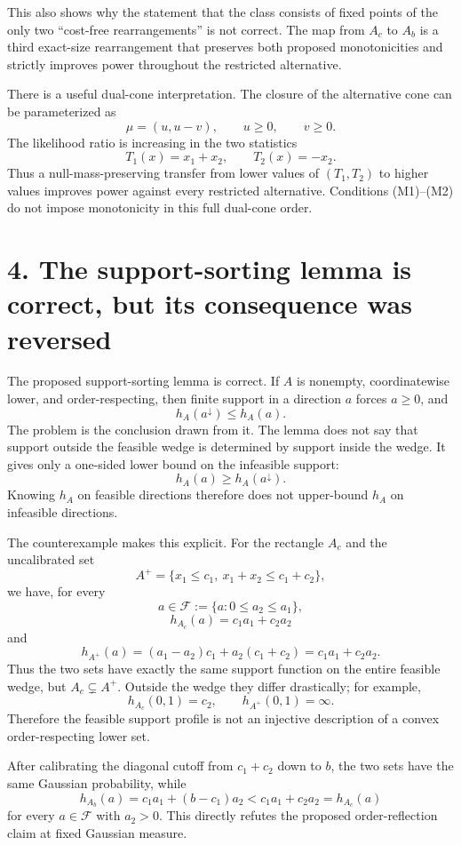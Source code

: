 \documentclass[12pt]{article}
\theoremstyle{definition}
\theoremstyle{remark}
\begin{document}
This also shows why the statement that the class consists of fixed points of the only two ``cost-free rearrangements'' is not correct.  The map from $A_c$ to $A_b$ is a third exact-size rearrangement that preserves both proposed monotonicities and strictly improves power throughout the restricted alternative.

There is a useful dual-cone interpretation.  The closure of the alternative cone can be parameterized as
\[
\mu=(u,u-v),
\qquad
u\ge0,
\qquad
v\ge0.
\]
The likelihood ratio is increasing in the two statistics
\[
T_1(x)=x_1+x_2,
\qquad
T_2(x)=-x_2.
\]
Thus a null-mass-preserving transfer from lower values of $(T_1,T_2)$ to higher values improves power against every restricted alternative.  Conditions (M1)--(M2) do not impose monotonicity in this full dual-cone order.

\section*{4. The support-sorting lemma is correct, but its consequence was reversed}

The proposed support-sorting lemma is correct.  If $A$ is nonempty, coordinatewise lower, and order-respecting, then finite support in a direction $a$ forces $a\ge0$, and
\[
h_A(a^\downarrow)\le h_A(a).
\]
The problem is the conclusion drawn from it.  The lemma does not say that support outside the feasible wedge is determined by support inside the wedge.  It gives only a one-sided lower bound on the infeasible support:
\[
h_A(a)\ge h_A(a^\downarrow).
\]
Knowing $h_A$ on feasible directions therefore does not upper-bound $h_A$ on infeasible directions.

The counterexample makes this explicit.  For the rectangle $A_c$ and the uncalibrated set
\[
A^+=\{x_1\le c_1,\ x_1+x_2\le c_1+c_2\},
\]
we have, for every
\[
a\in\mathcal F:=\{a:0\le a_2\le a_1\},
\]
\[
h_{A_c}(a)=c_1a_1+c_2a_2
\]
and
\[
h_{A^+}(a)
=(a_1-a_2)c_1+a_2(c_1+c_2)
=c_1a_1+c_2a_2.
\]
Thus the two sets have exactly the same support function on the entire feasible wedge, but $A_c\subsetneq A^+$.  Outside the wedge they differ drastically; for example,
\[
h_{A_c}(0,1)=c_2,
\qquad
h_{A^+}(0,1)=\infty.
\]
Therefore the feasible support profile is not an injective description of a convex order-respecting lower set.

After calibrating the diagonal cutoff from $c_1+c_2$ down to $b$, the two sets have the same Gaussian probability, while
\begin{equation}\label{eq:support-order}
h_{A_b}(a)
=c_1a_1+(b-c_1)a_2
<
c_1a_1+c_2a_2
=h_{A_c}(a)
\end{equation}
for every $a\in\mathcal F$ with $a_2>0$.  This directly refutes the proposed order-reflection claim at fixed Gaussian measure.
\end{document}
